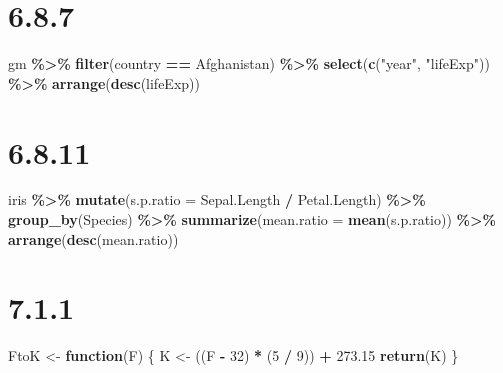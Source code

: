 \documentclass[
]{krantz}
\newenvironment{Shaded}{\begin{snugshade}}{\end{snugshade}}
\newcommand{\ControlFlowTok}[1]{\textcolor[rgb]{0.13,0.29,0.53}{\textbf{#1}}}
\newcommand{\DataTypeTok}[1]{\textcolor[rgb]{0.13,0.29,0.53}{#1}}
\newcommand{\DecValTok}[1]{\textcolor[rgb]{0.00,0.00,0.81}{#1}}
\newcommand{\FloatTok}[1]{\textcolor[rgb]{0.00,0.00,0.81}{#1}}
\newcommand{\KeywordTok}[1]{\textcolor[rgb]{0.13,0.29,0.53}{\textbf{#1}}}
\newcommand{\NormalTok}[1]{#1}
\newcommand{\OperatorTok}[1]{\textcolor[rgb]{0.81,0.36,0.00}{\textbf{#1}}}
\newcommand{\StringTok}[1]{\textcolor[rgb]{0.31,0.60,0.02}{#1}}
\begin{document}
\hypertarget{section-7}{%
\section*{6.8.7}\label{section-7}}


\begin{Shaded}
\begin{Highlighting}[]
\NormalTok{gm }\OperatorTok{\%\textgreater{}\%}\StringTok{ }
\StringTok{  }\KeywordTok{filter}\NormalTok{(country }\OperatorTok{==}\StringTok{ \textquotesingle{}Afghanistan\textquotesingle{}}\NormalTok{) }\OperatorTok{\%\textgreater{}\%}\StringTok{ }
\StringTok{  }\KeywordTok{select}\NormalTok{(}\KeywordTok{c}\NormalTok{(}\StringTok{"year"}\NormalTok{, }\StringTok{"lifeExp"}\NormalTok{)) }\OperatorTok{\%\textgreater{}\%}\StringTok{ }
\StringTok{  }\KeywordTok{arrange}\NormalTok{(}\KeywordTok{desc}\NormalTok{(lifeExp))}
\end{Highlighting}
\end{Shaded}

\hypertarget{section-8}{%
\section*{6.8.11}\label{section-8}}


\begin{Shaded}
\begin{Highlighting}[]
\NormalTok{iris }\OperatorTok{\%\textgreater{}\%}\StringTok{ }
\StringTok{  }\KeywordTok{mutate}\NormalTok{(}\DataTypeTok{s.p.ratio =}\NormalTok{ Sepal.Length }\OperatorTok{/}\StringTok{ }\NormalTok{Petal.Length) }\OperatorTok{\%\textgreater{}\%}\StringTok{ }
\StringTok{  }\KeywordTok{group\_by}\NormalTok{(Species) }\OperatorTok{\%\textgreater{}\%}\StringTok{ }
\StringTok{  }\KeywordTok{summarize}\NormalTok{(}\DataTypeTok{mean.ratio =} \KeywordTok{mean}\NormalTok{(s.p.ratio)) }\OperatorTok{\%\textgreater{}\%}\StringTok{ }
\StringTok{  }\KeywordTok{arrange}\NormalTok{(}\KeywordTok{desc}\NormalTok{(mean.ratio))}
\end{Highlighting}
\end{Shaded}

\hypertarget{section-9}{%
\section*{7.1.1}\label{section-9}}


\begin{Shaded}
\begin{Highlighting}[]
\NormalTok{FtoK \textless{}{-}}\StringTok{ }\ControlFlowTok{function}\NormalTok{(F) \{}
\NormalTok{  K \textless{}{-}}\StringTok{ }\NormalTok{((F }\OperatorTok{{-}}\StringTok{ }\DecValTok{32}\NormalTok{) }\OperatorTok{*}\StringTok{ }\NormalTok{(}\DecValTok{5} \OperatorTok{/}\StringTok{ }\DecValTok{9}\NormalTok{)) }\OperatorTok{+}\StringTok{ }\FloatTok{273.15}
  \KeywordTok{return}\NormalTok{(K)}
\NormalTok{\}}
\end{Highlighting}
\end{Shaded}
\end{document}

